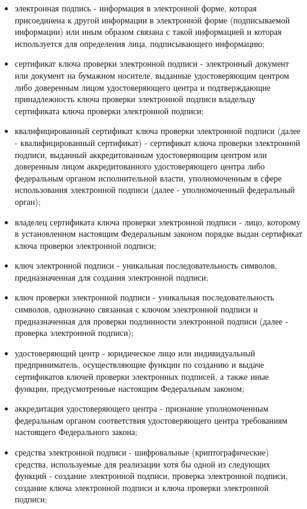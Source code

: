 \begin{itemize}
	\item электронная подпись - информация в электронной форме, которая присоединена к другой информации в электронной форме (подписываемой информации) или иным образом связана с такой информацией и которая используется для определения лица, подписывающего информацию;
	\item сертификат ключа проверки электронной подписи - электронный документ или документ на бумажном носителе, выданные удостоверяющим центром либо доверенным лицом удостоверяющего центра и подтверждающие принадлежность ключа проверки электронной подписи владельцу сертификата ключа проверки электронной подписи;
	\item квалифицированный сертификат ключа проверки электронной подписи (далее - квалифицированный сертификат) - сертификат ключа проверки электронной подписи, выданный аккредитованным удостоверяющим центром или доверенным лицом аккредитованного удостоверяющего центра либо федеральным органом исполнительной власти, уполномоченным в сфере использования электронной подписи (далее - уполномоченный федеральный орган);
	\item владелец сертификата ключа проверки электронной подписи - лицо, которому в установленном настоящим Федеральным законом порядке выдан сертификат ключа проверки электронной подписи;
	\item ключ электронной подписи - уникальная последовательность символов, предназначенная для создания электронной подписи;
	\item ключ проверки электронной подписи - уникальная последовательность символов, однозначно связанная с ключом электронной подписи и предназначенная для проверки подлинности электронной подписи (далее - проверка электронной подписи);
	\item удостоверяющий центр - юридическое лицо или индивидуальный предприниматель, осуществляющие функции по созданию и выдаче сертификатов ключей проверки электронных подписей, а также иные функции, предусмотренные настоящим Федеральным законом;
	\item аккредитация удостоверяющего центра - признание уполномоченным федеральным органом соответствия удостоверяющего центра требованиям настоящего Федерального закона;
	\item средства электронной подписи - шифровальные (криптографические) средства, используемые для реализации хотя бы одной из следующих функций - создание электронной подписи, проверка электронной подписи, создание ключа электронной подписи и ключа проверки электронной подписи;

\end{itemize}
